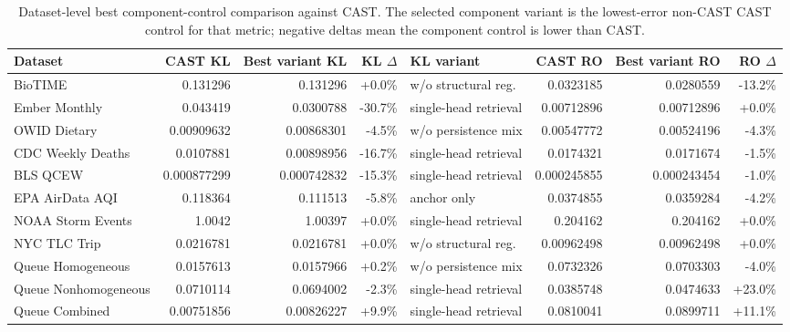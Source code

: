 \begin{table}[t]
\centering
\caption{Dataset-level best component-control comparison against CAST. The selected component variant is the lowest-error non-CAST CAST control for that metric; negative deltas mean the component control is lower than CAST.}
\label{tab:appendix-ablation-best-variant-deltas}
\scriptsize
\setlength{\tabcolsep}{3.0pt}
\begin{tabular}{@{}lrrrlrrr@{}}
\toprule
Dataset & CAST KL & Best variant KL & KL $\Delta$ & KL variant & CAST RO & Best variant RO & RO $\Delta$ \\
\midrule
BioTIME & 0.131296 & 0.131296 & +0.0\% & w/o structural reg. & 0.0323185 & 0.0280559 & -13.2\% \\
Ember Monthly & 0.043419 & 0.0300788 & -30.7\% & single-head retrieval & 0.00712896 & 0.00712896 & +0.0\% \\
OWID Dietary & 0.00909632 & 0.00868301 & -4.5\% & w/o persistence mix & 0.00547772 & 0.00524196 & -4.3\% \\
CDC Weekly Deaths & 0.0107881 & 0.00898956 & -16.7\% & single-head retrieval & 0.0174321 & 0.0171674 & -1.5\% \\
BLS QCEW & 0.000877299 & 0.000742832 & -15.3\% & single-head retrieval & 0.000245855 & 0.000243454 & -1.0\% \\
EPA AirData AQI & 0.118364 & 0.111513 & -5.8\% & anchor only & 0.0374855 & 0.0359284 & -4.2\% \\
NOAA Storm Events & 1.0042 & 1.00397 & +0.0\% & single-head retrieval & 0.204162 & 0.204162 & +0.0\% \\
NYC TLC Trip & 0.0216781 & 0.0216781 & +0.0\% & w/o structural reg. & 0.00962498 & 0.00962498 & +0.0\% \\
Queue Homogeneous & 0.0157613 & 0.0157966 & +0.2\% & w/o persistence mix & 0.0732326 & 0.0703303 & -4.0\% \\
Queue Nonhomogeneous & 0.0710114 & 0.0694002 & -2.3\% & single-head retrieval & 0.0385748 & 0.0474633 & +23.0\% \\
Queue Combined & 0.00751856 & 0.00826227 & +9.9\% & single-head retrieval & 0.0810041 & 0.0899711 & +11.1\% \\
\bottomrule
\end{tabular}
\end{table}
